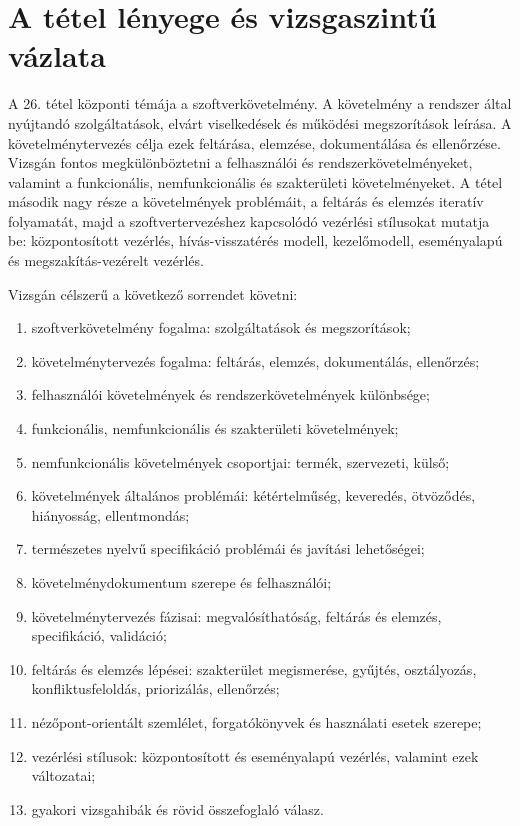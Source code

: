 \section{A tétel lényege és vizsgaszintű vázlata}

\begin{summarybox}
A 26. tétel központi témája a szoftverkövetelmény. A követelmény a rendszer által nyújtandó szolgáltatások, elvárt viselkedések és működési megszorítások leírása. A követelménytervezés célja ezek feltárása, elemzése, dokumentálása és ellenőrzése. Vizsgán fontos megkülönböztetni a felhasználói és rendszerkövetelményeket, valamint a funkcionális, nemfunkcionális és szakterületi követelményeket. A tétel második nagy része a követelmények problémáit, a feltárás és elemzés iteratív folyamatát, majd a szoftvertervezéshez kapcsolódó vezérlési stílusokat mutatja be: központosított vezérlés, hívás-visszatérés modell, kezelőmodell, eseményalapú és megszakítás-vezérelt vezérlés.
\end{summarybox}

Vizsgán célszerű a következő sorrendet követni:

\begin{enumerate}
  \item szoftverkövetelmény fogalma: szolgáltatások és megszorítások;
  \item követelménytervezés fogalma: feltárás, elemzés, dokumentálás, ellenőrzés;
  \item felhasználói követelmények és rendszerkövetelmények különbsége;
  \item funkcionális, nemfunkcionális és szakterületi követelmények;
  \item nemfunkcionális követelmények csoportjai: termék, szervezeti, külső;
  \item követelmények általános problémái: kétértelműség, keveredés, ötvöződés, hiányosság, ellentmondás;
  \item természetes nyelvű specifikáció problémái és javítási lehetőségei;
  \item követelménydokumentum szerepe és felhasználói;
  \item követelménytervezés fázisai: megvalósíthatóság, feltárás és elemzés, specifikáció, validáció;
  \item feltárás és elemzés lépései: szakterület megismerése, gyűjtés, osztályozás, konfliktusfeloldás, priorizálás, ellenőrzés;
  \item nézőpont-orientált szemlélet, forgatókönyvek és használati esetek szerepe;
  \item vezérlési stílusok: központosított és eseményalapú vezérlés, valamint ezek változatai;
  \item gyakori vizsgahibák és rövid összefoglaló válasz.
\end{enumerate}

